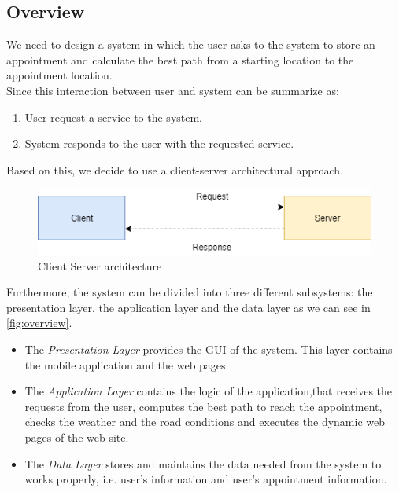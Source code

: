 \subsection{Overview}
We need to design a system in which the user asks to the system to store an appointment and calculate the best path from a starting location to the appointment location. \\
Since this interaction between user and system can be summarize as:
\begin{enumerate}
	\item User request a service to the system.
	\item System responds to the user with the requested service.
\end{enumerate}
Based on this, we decide to use a client-server architectural approach.
\begin{figure}[H]
	\includegraphics{Img/ClientServerArchitecture}
	\caption{Client Server architecture}
	\label{fig:clientserver}
\end{figure}
Furthermore, the system can be divided into three different subsystems: the presentation layer, the application layer and the data layer as we can see in \autoref{fig:overview}. 
\begin{itemize}
	\item The \emph{Presentation Layer} provides the GUI of the system. This layer contains
	the mobile application and the web pages.
	\item The \emph{Application Layer} contains the logic of the application,that receives 		the requests from the user, computes the best path to reach the appointment, checks the 	weather and the road conditions and executes the dynamic web pages of the web site.
	\item The \emph{Data Layer} stores and maintains the data needed from the system to 		works properly, i.e. user’s information and user’s appointment information.
\end{itemize}
